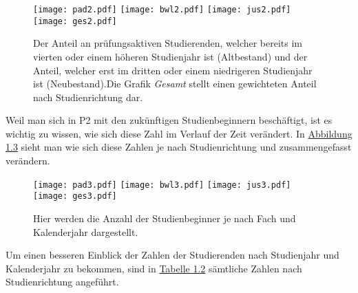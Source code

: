 \begin{figure}[ht]
  \label{fig:abb2}
  \texttt{[image: pad2.pdf]}
  \texttt{[image: bwl2.pdf]}
  \texttt{[image: jus2.pdf]}
  \texttt{[image: ges2.pdf]}
  \caption[Anteile des Neu- und Altbestandes an aktiven Studierenden]{Der Anteil an prüfungsaktiven Studierenden, welcher bereits im vierten oder einem höheren 
  Studienjahr ist (Altbestand) und der Anteil, welcher erst im dritten oder einem niedrigeren Studienjahr ist (Neubestand).Die Grafik \textit{Gesamt} stellt einen gewichteten
  Anteil nach Studienrichtung dar.}
\end{figure}

Weil man sich in P2 mit den zuk\"unftigen Studienbeginnern besch\"aftigt, ist es wichtig zu wissen, wie sich diese Zahl im Verlauf der Zeit ver\"andert. In 
\hyperref[fig:abb3]{Abbildung 1.3} sieht man wie sich diese Zahlen je nach Studienrichtung und zusammengefasst ver\"andern. 

\begin{figure}[ht]
  \label{fig:abb3}
  \texttt{[image: pad3.pdf]}
  \texttt{[image: bwl3.pdf]}
  \texttt{[image: jus3.pdf]}
  \texttt{[image: ges3.pdf]}
  \caption[Anzahl der Studienbeginner nach Fach und Kalenderjahr]{Hier werden die Anzahl der Studienbeginner je nach Fach und Kalenderjahr dargestellt.}
\end{figure}

Um einen besseren Einblick der Zahlen der Studierenden nach Studienjahr und Kalenderjahr zu bekommen, sind in \hyperref[tab:numbers]{Tabelle 1.2} s\"amtliche 
Zahlen nach Studienrichtung angef\"uhrt. 

